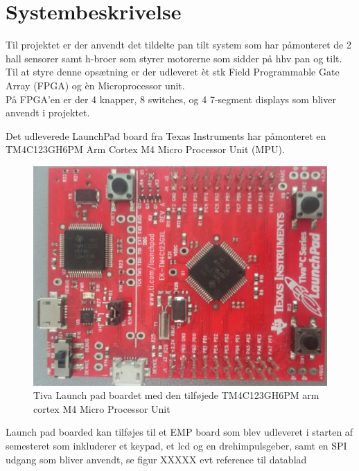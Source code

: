 \section{Systembeskrivelse}
Til projektet er der anvendt det tildelte pan tilt system som har påmonteret de 2 hall sensorer samt h-broer som styrer motorerne som sidder på hhv pan og tilt.\\
Til at styre denne opsætning er der udleveret èt stk Field Programmable Gate Array (FPGA) og èn Microprocessor unit.
\\
På FPGA'en \cite{Nexys2Datasheet} er der 4 knapper, 8 switches, og 4 7-segment displays som bliver anvendt i projektet.

Det udleverede LaunchPad board fra Texas Instruments har påmonteret en TM4C123GH6PM Arm Cortex M4 Micro Processor Unit (MPU)\cite{TM4C123GH6PMDatasheet}.

\begin{figure}[!ht]
	\begin{center}
		\includegraphics[scale=0.1, angle =270]{Billeder/TivaLaunchPad.JPG}
	\end{center}
\caption{Tiva Launch pad boardet med den tilføjede TM4C123GH6PM arm cortex M4 Micro Processor Unit}
\label{fig:TivaLaunchPad}
\end{figure}

Launch pad boarded kan tilføjes til et EMP board som blev udleveret i starten af semesteret som inkluderer et keypad, et lcd og en drehimpulsgeber, samt en SPI udgang som bliver anvendt, se figur XXXXX evt reference til datablad

